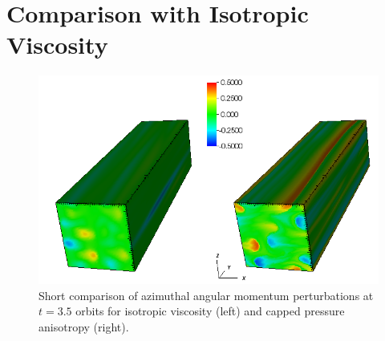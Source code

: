 \section{Comparison with Isotropic Viscosity}
%
%
\begin{figure}[h]
  \begin{center}  
    \includegraphics[width=.9\textwidth, angle=0.]{img/aniso_iso_compare_dVy_t35.png}
  \end{center}
  \caption{Short comparison of azimuthal angular momentum perturbations at $t=3.5$ orbits for isotropic viscosity (left) and capped pressure anisotropy (right). }
  \label{fig:vtkcompare}
\end{figure}

